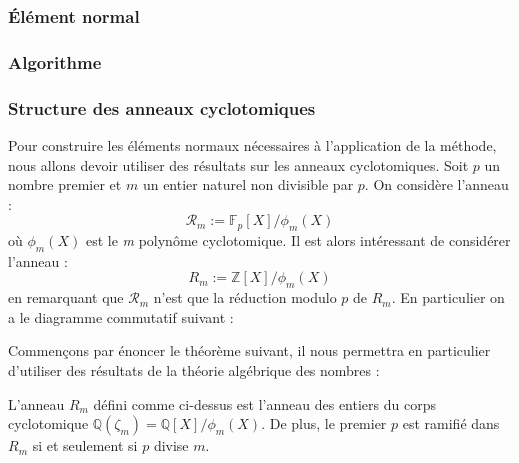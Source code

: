 \documentclass[a4paper]{article} %
\numberwithin{equation}{section}
\newcommand\nroot[1]{\textit{#1}\up{\textit{ième}}}
\begin{document}
\subsubsection{Élément normal}

\subsubsection{Algorithme}

\subsubsection{Structure des anneaux cyclotomiques}

Pour construire les éléments normaux nécessaires à l'application de la méthode, nous allons devoir utiliser des résultats sur les anneaux cyclotomiques. Soit $p$ un nombre premier et $m$ un entier naturel non divisible par $p$. On considère l'anneau :
\[\mathcal{R}_m :=\mathbb{F}_p[X]/\phi_m(X)\]
où $\phi_m(X)$ est le \nroot{m} polynôme cyclotomique. Il est alors intéressant de considérer l'anneau :
\[R_m := \mathbb{Z}[X]/\phi_m(X)\]
en remarquant que $\mathcal{R}_m$ n'est que la réduction modulo $p$ de $R_m$. En particulier on a le diagramme commutatif suivant :

\begin{center}
\end{center}

Commençons par énoncer le théorème suivant, il nous permettra en particulier d'utiliser des résultats de la théorie algébrique des nombres :

\begin{thm} 
\label{ramrm}
L'anneau $R_m$ défini comme ci-dessus est l'anneau des entiers du corps cyclotomique $\mathbb{Q}(\zeta_m) = \mathbb{Q}[X]/\phi_m(X)$. De plus, le premier $p$ est ramifié dans $R_m$ si et seulement si $p$ divise $m$.
\end{thm}
\end{document}
